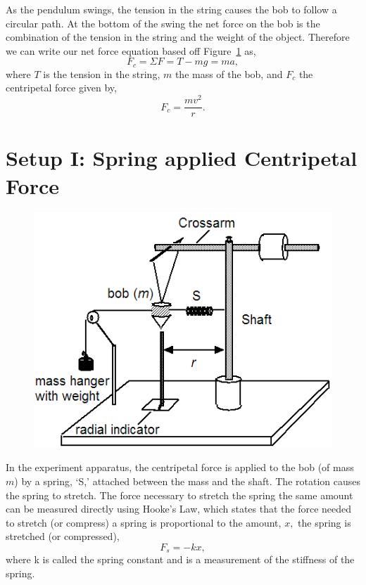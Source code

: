\documentclass[main.tex]{subfiles}
\begin{document}
\begin{figure}
\centering
{}
\caption{} \label{fig:freebody}
\end{figure}
As the pendulum swings, the tension in the string causes the bob to follow a circular path. At the bottom of the swing the net force on the bob is the combination of the tension in the string and the weight of the object. Therefore we can write our net force equation based off Figure~\ref{fig:freebody} as,
\begin{equation}
F_c=\Sigma F=T-mg=ma,
\end{equation}
where $T$ is the tension in the string, $m$ the mass of the bob, and $F_c$ the centripetal force given by,
\begin{equation} \label{eq:CenForce2}
F_c=\frac{mv^2}{r}.
\end{equation}

\section{Setup I: Spring applied Centripetal Force}
\begin{figure}[h]
\centering
\includegraphics{CenForce_1_Setup} \label{page:CenForce_1_Setup}
\end{figure}

In the experiment apparatus, the centripetal force is applied to the bob (of mass $m$) by a spring, `S,' attached between the mass and the shaft.  The rotation causes the spring to stretch. The force necessary to stretch the spring the same amount can be measured directly using Hooke's Law, which states that the force needed to stretch (or compress) a spring is proportional to the amount, $x,$ the spring is stretched (or compressed),
\[
F_s=-kx,
\]
where k is called the spring constant and is a measurement of the stiffness of the spring.
\end{document}
